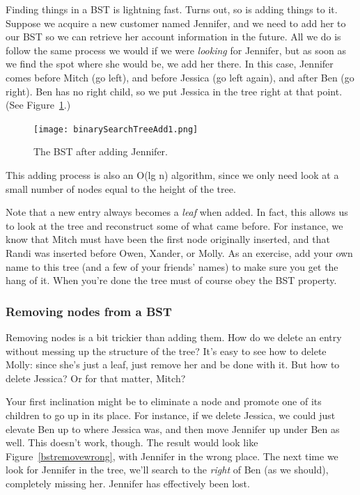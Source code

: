 Finding things in a BST is lightning fast. Turns out, so is adding things
to it. Suppose we acquire a new customer named Jennifer, and we need to add
her to our BST so we can retrieve her account information in the future.
All we do is follow the same process we would if we were \textit{looking}
for Jennifer, but as soon as we find the spot where she would be, we add
her there. In this case, Jennifer comes before Mitch (go left), and before
Jessica (go left again), and after Ben (go right). Ben has no right child,
so we put Jessica in the tree right at that point. (See
Figure~\ref{bstadd1}.)

\begin{figure}[ht]
\centering
\texttt{[image: binarySearchTreeAdd1.png]}
\caption{The BST after adding Jennifer.}
\label{bstadd1}
\end{figure}

This adding process is also an O(lg n) algorithm, since we only need look
at a small number of nodes equal to the height of the tree.

Note that a new entry always becomes a \textit{leaf} when added. In fact,
this allows us to look at the tree and reconstruct some of what came
before. For instance, we know that Mitch must have been the first node
originally inserted, and that Randi was inserted before Owen, Xander, or
Molly. As an exercise, add your own name to this tree (and a few of your
friends' names) to make sure you get the hang of it. When you're done the
tree must of course obey the BST property.

\subsubsection{Removing nodes from a BST}

Removing nodes is a bit trickier than adding them. How do we delete an
entry without messing up the structure of the tree? It's easy to see how to
delete Molly: since she's just a leaf, just remove her and be done with it.
But how to delete Jessica? Or for that matter, Mitch?

Your first inclination might be to eliminate a node and promote one of its
children to go up in its place. For instance, if we delete Jessica, we
could just elevate Ben up to where Jessica was, and then move Jennifer up
under Ben as well. This doesn't work, though. The result would look like
Figure~\ref{bstremovewrong}, with Jennifer in the wrong place. The next
time we look for Jennifer in the tree, we'll search to the \textit{right}
of Ben (as we should), completely missing her. Jennifer has effectively
been lost.

